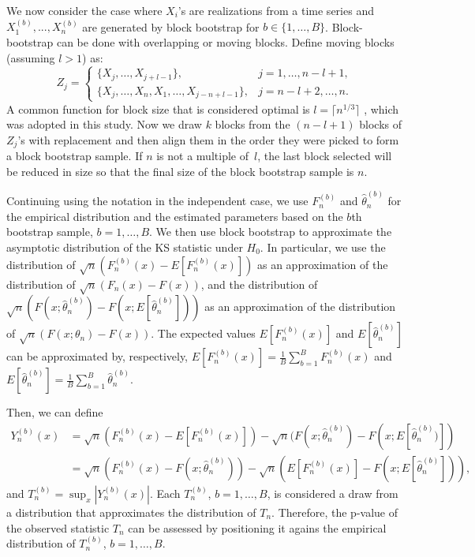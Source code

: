 \documentclass[APA,Times1COL]{WileyNJDv5} %
\begin{document}
We now consider the case where $X_i$'s are realizations from a time series and
$X^{(b)}_1,...,X^{(b)}_n$ are generated by block bootstrap for 
$b \in \{1, \ldots, B\}$.  
Block-bootstrap can be done with overlapping or moving blocks.
Define moving blocks (assuming $l > 1$) as:
\begin{equation*}
Z_j =
    \begin{cases}
        \{X_j, \ldots, X_{j + l - 1}\}, & j = 1, \dots, n - l + 1,\\
        \{X_j, \ldots, X_n, X_1, \ldots, X_{j-n+l-1}\}, & j = n - l
        + 2 ,\dots, n.
    \end{cases}
\end{equation*}
A common 
function for block size that is considered optimal is 
$l = \lceil n^{1/3} \rceil$ \citep{buhlmann1999block},  
which was adopted in this study.
Now we draw $k$ blocks from the $(n - l + 1)$ blocks 
of $Z_j$'s with replacement and then align them in the order they were picked to
form a block bootstrap sample. If $n$ is not a multiple of~$l$, the last block 
selected will be reduced in size so that the final size of the block bootstrap 
sample is $n$.


Continuing using the notation in the independent case,
we use $F^{(b)}_n$ and $\hat\theta^{(b)}_n$ for the empirical distribution and
the estimated parameters based on the $b$th bootstrap sample,
$b = 1, \ldots, B$.
We then use block bootstrap to approximate the asymptotic distribution of
the KS statistic under $H_0$. In particular, we
use the distribution of $\sqrt{n}(F^{(b)}_n(x) - E[F^{(b)}_n(x)])$
as an approximation of the distribution of
$\sqrt{n}(F_n(x) - F(x))$, and the distribution of 
$\sqrt{n}(F(x; \hat\theta^{(b)}_n) - F(x; E[\hat\theta^{(b)}_n]))$ as
an approximation of the distribution of $\sqrt{n}(F(x; \theta_n) - F(x))$.
The expected values $E[F^{(b)}_n(x)]$ and
$E[\hat\theta^{(b)}_n]$ can be approximated by, respectively,
$E[F^{(b)}_n(x)] = \frac{1}{B}\sum_{b = 1}^BF^{(b)}_n(x)$ and
$E[\hat\theta^{(b)}_n]  =  \frac{1}{B}\sum_{b = 1}^B\hat\theta^{(b)}_n$.


Then, we can define
\begin{align*}
  Y^{(b)}_n(x) &= \sqrt{n}(F^{(b)}_n(x) - E[F^{(b)}_n(x)]) - 
             \sqrt{n}(F(x; \hat\theta^{(b)}_n) - F(x; E[\hat\theta^{(b)}_n)]) \\
           &= \sqrt{n}(F^{(b)}_n(x) - F(x; \hat\theta^{(b)}_n)) -
             \sqrt{n}(E[F^{(b)}_n(x)] - F(x; E[\hat\theta^{(b)}_n])),
\end{align*}
and $T^{(b)}_n = \sup_x|Y^{(b)}_n(x)|$. Each $T_n^{(b)}$,
$b =1, \ldots, B$, is considered a draw from a distribution that approximates
the distribution of $T_n$. Therefore, the p-value of the observed statistic
$T_n$ can be assessed by positioning it agains the empirical distribution of
$T_n^{(b)}$, $b = 1, \ldots, B$.
\end{document}
